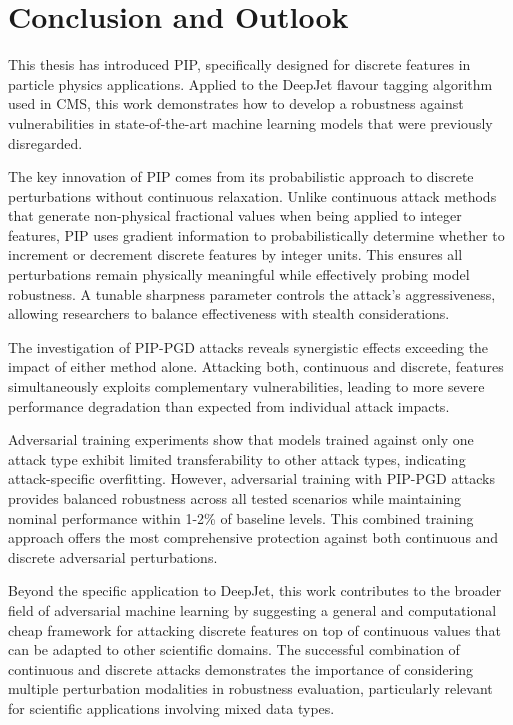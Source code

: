 \chapter{Conclusion and Outlook}

This thesis has introduced PIP, specifically designed for discrete features in particle physics applications. Applied to the DeepJet flavour tagging algorithm used in CMS, this work demonstrates how to develop a robustness against vulnerabilities in state-of-the-art machine learning models that were previously disregarded.

The key innovation of PIP comes from its probabilistic approach to discrete perturbations without continuous relaxation. Unlike continuous attack methods that generate non-physical fractional values when being applied to integer features, PIP uses gradient information to probabilistically determine whether to increment or decrement discrete features by integer units. This ensures all perturbations remain physically meaningful while effectively probing model robustness. A tunable sharpness parameter controls the attack's aggressiveness, allowing researchers to balance effectiveness with stealth considerations.

The investigation of PIP-PGD attacks reveals synergistic effects exceeding the impact of either method alone. Attacking both, continuous and discrete, features simultaneously exploits complementary vulnerabilities, leading to more severe performance degradation than expected from individual attack impacts.

Adversarial training experiments show that models trained against only one attack type exhibit limited transferability to other attack types, indicating attack-specific overfitting. However, adversarial training with PIP-PGD attacks provides balanced robustness across all tested scenarios while maintaining nominal performance within 1-2\% of baseline levels. This combined training approach offers the most comprehensive protection against both continuous and discrete adversarial perturbations.

Beyond the specific application to DeepJet, this work contributes to the broader field of adversarial machine learning by suggesting a general and computational cheap framework for attacking discrete features on top of continuous values that can be adapted to other scientific domains. The successful combination of continuous and discrete attacks demonstrates the importance of considering multiple perturbation modalities in robustness evaluation, particularly relevant for scientific applications involving mixed data types.

